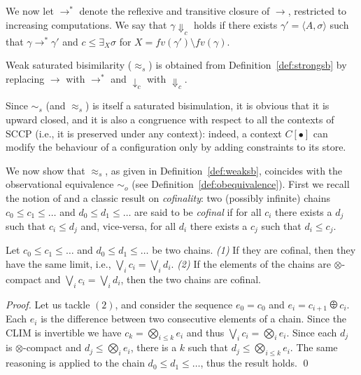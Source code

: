 \documentclass[main.tex]{subfiles}
\begin{document}
We now let $\longrightarrow^*$ denote the reflexive and transitive closure of $\longrightarrow$, restricted to increasing computations.
We say that  $\gamma \Downarrow_c$ holds if there exists $\gamma' = \langle A, \sigma \rangle$ such that 
$\gamma \longrightarrow^* \gamma'$ and $c \leq \exists_{X} \sigma$ for $X = fv(\gamma') \setminus fv(\gamma)$.

\begin{definition}\label{def:weaksb}
Weak saturated bisimilarity
($\approx_{\mathit{s}}$) is obtained from Definition~\ref{def:strongsb} by replacing $\longrightarrow$ with $\longrightarrow^*$ and $\downarrow_c$ with $\Downarrow_c$.
\end{definition}

Since $\sim_{\mathit{s}}$ (and $\approx_{\mathit{s}}$) is itself a  saturated bisimulation, it is obvious that it is upward closed, and it is also a congruence with respect to all the contexts of SCCP (i.e., it is preserved under any context): indeed, a context $C[\bullet]$ can modify the behaviour of a configuration only by adding constraints to its store.

We now show that $\approx_{\mathit{s}}$, as given in Definition~\ref{def:weaksb}, coincides with the observational equivalence $\sim_o$ (see Definition~\ref{def:obequivalence}). First we recall the notion of and a classic result on \emph{cofinality}: two (possibly infinite) chains $c_0 \leq c_1 \leq \dots$ and  $d_0 \leq d_1 \leq \dots$ are said to be \emph{cofinal} if for all $c_i$ there exists a $d_j$ such that $c_i \leq d_j$ and, vice-versa, for all $d_i$ there exists a $c_j$ such that $d_i \leq c_j$.

\begin{lemma}\label{lem:cofinality} Let $c_0 \leq c_1 \leq \dots$ and $d_0 \leq d_1 \leq \dots $ be two chains. \emph{(1)} If they are cofinal, then they have the same limit, i.e., $\bigvee_i c_i = \bigvee_i d_i$. \emph{(2)} If the elements of the chains are $\otimes$-compact and $\bigvee_i c_i = \bigvee_i d_i$, then the two chains are cofinal.\end{lemma}
\begin{proof}
Let us tackle $(2)$, and consider the sequence $e_0 = c_0$ and $e_{i} = c_{i+1} \odiv c_i$.
Each $e_i$ is the difference between two consecutive elements of a chain.
%
Since the CLIM is invertible we have $c_k =  \bigotimes_{i \leq k} e_i$ and thus
$\bigvee_i c_i = \bigotimes_i e_i$. Since each $d_j$ is $\otimes$-compact and
$d_j \leq \bigotimes_i e_i$, there is a $k$ such that $d_j \leq \bigotimes_{i \leq k} e_i$.
The same reasoning is applied to the chain $d_0 \leq d_1 \leq \dots $, thus
the result holds. \qed
\end{proof}
\end{document}
